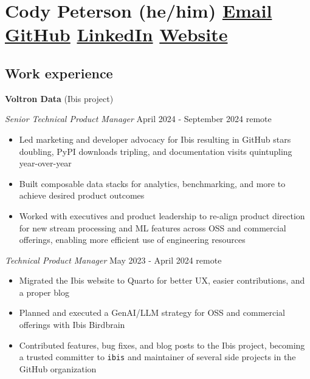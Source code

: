 \documentclass[
  10pt,
  letterpaper,
  DIV=11,
  numbers=noendperiod]{scrartcl}
\author{}
\date{}
\providecommand{\tightlist}{%
  \setlength{\itemsep}{0pt}\setlength{\parskip}{0pt}}\usepackage{longtable,booktabs,array}
\begin{document}
\section{\texorpdfstring{Cody Peterson (he/him) \textbar{}
\href{mailto:cody@dkdc.dev}{Email} \textbar{}
\href{https://github.com/lostmygithubaccount}{GitHub} \textbar{}
\href{https://linkedin.com/in/codydkdc}{LinkedIn} \textbar{}
\href{https://dkdc.dev}{Website}}{Cody Peterson (he/him) \textbar{} Email \textbar{} GitHub \textbar{} LinkedIn \textbar{} Website}}\label{cody-peterson-hehim-email-github-linkedin-website}

\subsection{Work experience}\label{work-experience}

\textbf{Voltron Data} (Ibis project)

\emph{Senior Technical Product Manager} \textbar{} April 2024 -
September 2024 \textbar{} remote

\begin{itemize}
\tightlist
\item
  Led marketing and developer advocacy for Ibis resulting in GitHub
  stars doubling, PyPI downloads tripling, and documentation visits
  quintupling year-over-year
\item
  Built composable data stacks for analytics, benchmarking, and more to
  achieve desired product outcomes
\item
  Worked with executives and product leadership to re-align product
  direction for new stream processing and ML features across OSS and
  commercial offerings, enabling more efficient use of engineering
  resources
\end{itemize}

\emph{Technical Product Manager} \textbar{} May 2023 - April 2024
\textbar{} remote

\begin{itemize}
\tightlist
\item
  Migrated the Ibis website to Quarto for better UX, easier
  contributions, and a proper blog
\item
  Planned and executed a GenAI/LLM strategy for OSS and commercial
  offerings with Ibis Birdbrain
\item
  Contributed features, bug fixes, and blog posts to the Ibis project,
  becoming a trusted committer to \texttt{ibis} and maintainer of
  several side projects in the GitHub organization
\end{itemize}
\end{document}
